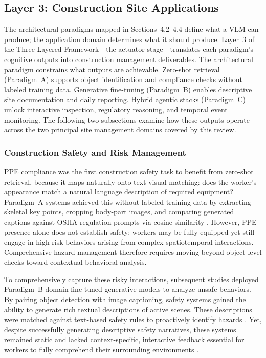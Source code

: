 \documentclass[10pt,letterpaper]{article}
\begin{document}
\subsection{Layer 3: Construction Site Applications}

The architectural paradigms mapped in Sections~4.2--4.4 define what a VLM can produce; the application domain determines what it should produce. Layer~3 of the Three-Layered Framework---the actuator stage---translates each paradigm's cognitive outputs into construction management deliverables. The architectural paradigm constrains what outputs are achievable. Zero-shot retrieval (Paradigm~A) supports object identification and compliance checks without labeled training data. Generative fine-tuning (Paradigm~B) enables descriptive site documentation and daily reporting. Hybrid agentic stacks (Paradigm~C) unlock interactive inspection, regulatory reasoning, and temporal event monitoring. The following two subsections examine how these outputs operate across the two principal site management domains covered by this review.

\subsubsection{Construction Safety and Risk Management}

PPE compliance was the first construction safety task to benefit from zero-shot retrieval, because it maps naturally onto text-visual matching: does the worker's appearance match a natural language description of required equipment? Paradigm~A systems achieved this without labeled training data by extracting skeletal key points, cropping body-part images, and comparing generated captions against OSHA regulation prompts via cosine similarity \cite{gil2024}. However, PPE presence alone does not establish safety: workers may be fully equipped yet still engage in high-risk behaviors arising from complex spatiotemporal interactions. Comprehensive hazard management therefore requires moving beyond object-level checks toward contextual behavioral analysis.

To comprehensively capture these risky interactions, subsequent studies deployed Paradigm~B domain fine-tuned generative models to analyze unsafe behaviors. By pairing object detection with image captioning, safety systems gained the ability to generate rich textual descriptions of active scenes. These descriptions were matched against text-based safety rules to proactively identify hazards \cite{wangxiao2024}. Yet, despite successfully generating descriptive safety narratives, these systems remained static and lacked context-specific, interactive feedback essential for workers to fully comprehend their surrounding environments \cite{chen2024}.
\end{document}
